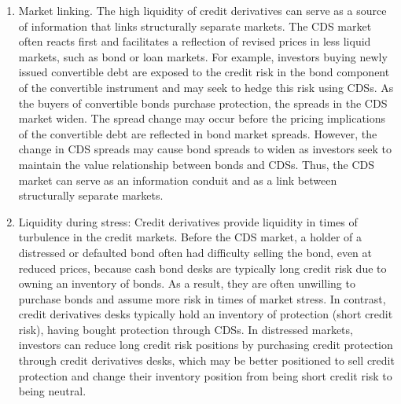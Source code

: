 \documentclass[11pt]{article}
\begin{document}
\begin{enumerate}
  \item Market linking. The high liquidity of credit derivatives can serve as a source of information that links structurally separate markets. The CDS market often reacts first and facilitates a reflection of revised prices in less liquid markets, such as bond or loan markets. For example, investors buying newly issued convertible debt are exposed to the credit risk in the bond component of the convertible instrument and may seek to hedge this risk using CDSs. As the buyers of convertible bonds purchase protection, the spreads in the CDS market widen. The spread change may occur before the pricing implications of the convertible debt are reflected in bond market spreads. However, the change in CDS spreads may cause bond spreads to widen as investors seek to maintain the value relationship between bonds and CDSs. Thus, the CDS market can serve as an information conduit and as a link between structurally separate markets.

  \item Liquidity during stress: Credit derivatives provide liquidity in times of turbulence in the credit markets. Before the CDS market, a holder of a distressed or defaulted bond often had difficulty selling the bond, even at reduced prices, because cash bond desks are typically long credit risk due to owning an inventory of bonds. As a result, they are often unwilling to purchase bonds and assume more risk in times of market stress. In contrast, credit derivatives desks typically hold an inventory of protection (short credit risk), having bought protection through CDSs. In distressed markets, investors can reduce long credit risk positions by purchasing credit protection through credit derivatives desks, which may be better positioned to sell credit protection and change their inventory position from being short credit risk to being neutral.

\end{enumerate}
\end{document}
